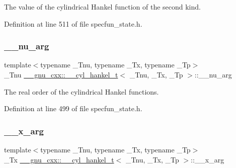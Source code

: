 The value of the cylindrical Hankel function of the second kind. 



Definition at line 511 of file specfun\+\_\+state.\+h.

\mbox{\label{struct____gnu__cxx_1_1____cyl__hankel__t_a67499e047360bcfc7c84f0e3c1d36dab}} 
\subsubsection{\texorpdfstring{\+\_\+\+\_\+nu\+\_\+arg}{\_\_nu\_arg}}
{\footnotesize\ttfamily template$<$typename \+\_\+\+Tnu, typename \+\_\+\+Tx, typename \+\_\+\+Tp$>$ \\
\+\_\+\+Tnu \hyperlink{struct____gnu__cxx_1_1____cyl__hankel__t}{\+\_\+\+\_\+gnu\+\_\+cxx\+::\+\_\+\+\_\+cyl\+\_\+hankel\+\_\+t}$<$ \+\_\+\+Tnu, \+\_\+\+Tx, \+\_\+\+Tp $>$\+::\+\_\+\+\_\+nu\+\_\+arg}



The real order of the cylindrical Hankel functions. 



Definition at line 499 of file specfun\+\_\+state.\+h.

\mbox{\label{struct____gnu__cxx_1_1____cyl__hankel__t_a7b1009ea94ea381fcae13abc9da8b9c6}} 
\subsubsection{\texorpdfstring{\+\_\+\+\_\+x\+\_\+arg}{\_\_x\_arg}}
{\footnotesize\ttfamily template$<$typename \+\_\+\+Tnu, typename \+\_\+\+Tx, typename \+\_\+\+Tp$>$ \\
\+\_\+\+Tx \hyperlink{struct____gnu__cxx_1_1____cyl__hankel__t}{\+\_\+\+\_\+gnu\+\_\+cxx\+::\+\_\+\+\_\+cyl\+\_\+hankel\+\_\+t}$<$ \+\_\+\+Tnu, \+\_\+\+Tx, \+\_\+\+Tp $>$\+::\+\_\+\+\_\+x\+\_\+arg}



